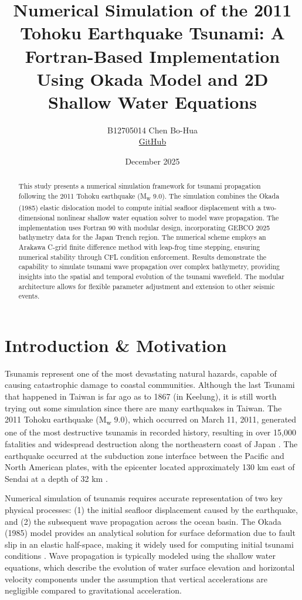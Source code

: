\documentclass[12pt]{article}
\title{Numerical Simulation of the 2011 Tohoku Earthquake Tsunami:
A Fortran-Based Implementation Using Okada Model and
2D Shallow Water Equations}
\author{B12705014 Chen Bo-Hua\\ 
\small \href{https://github.com/ckhsc17/earth-science-programming/tree/main/Final}{GitHub}}
\date{December 2025}
\begin{document}
\maketitle

\begin{abstract}
This study presents a numerical simulation framework for tsunami propagation following the 2011 Tohoku earthquake (M\textsubscript{w} 9.0). The simulation combines the Okada (1985) elastic dislocation model to compute initial seafloor displacement with a two-dimensional nonlinear shallow water equation solver to model wave propagation. The implementation uses Fortran 90 with modular design, incorporating GEBCO 2025 bathymetry data for the Japan Trench region. The numerical scheme employs an Arakawa C-grid finite difference method with leap-frog time stepping, ensuring numerical stability through CFL condition enforcement. Results demonstrate the capability to simulate tsunami wave propagation over complex bathymetry, providing insights into the spatial and temporal evolution of the tsunami wavefield. The modular architecture allows for flexible parameter adjustment and extension to other seismic events.
\end{abstract}

\section{Introduction & Motivation}

Tsunamis represent one of the most devastating natural hazards, capable of causing catastrophic damage to coastal communities. Although the last Tsunami that happened in Taiwan is far ago as to 1867 (in Keelung), it is still worth trying out some simulation since there are many earthquakes in Taiwan. The 2011 Tohoku earthquake (M\textsubscript{w} 9.0), which occurred on March 11, 2011, generated one of the most destructive tsunamis in recorded history, resulting in over 15,000 fatalities and widespread destruction along the northeastern coast of Japan \cite{satake2013}. The earthquake occurred at the subduction zone interface between the Pacific and North American plates, with the epicenter located approximately 130 km east of Sendai at a depth of 32 km \cite{usgs2011}.

Numerical simulation of tsunamis requires accurate representation of two key physical processes: (1) the initial seafloor displacement caused by the earthquake, and (2) the subsequent wave propagation across the ocean basin. The Okada (1985) model provides an analytical solution for surface deformation due to fault slip in an elastic half-space, making it widely used for computing initial tsunami conditions \cite{okada1985}. Wave propagation is typically modeled using the shallow water equations, which describe the evolution of water surface elevation and horizontal velocity components under the assumption that vertical accelerations are negligible compared to gravitational acceleration.
\end{document}
